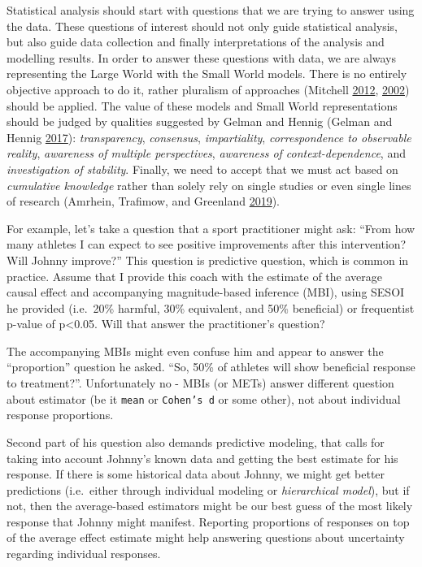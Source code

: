 \documentclass[
]{book}
\begin{document}
Statistical analysis should start with questions that we are trying to answer using the data. These questions of interest should not only guide statistical analysis, but also guide data collection and finally interpretations of the analysis and modelling results. In order to answer these questions with data, we are always representing the Large World with the Small World models. There is no entirely objective approach to do it, rather pluralism of approaches (Mitchell \protect\hyperlink{ref-mitchellUnsimpleTruthsScience2012}{2012}, \protect\hyperlink{ref-mitchellIntegrativePluralism2002}{2002}) should be applied. The value of these models and Small World representations should be judged by qualities suggested by Gelman and Hennig (Gelman and Hennig \protect\hyperlink{ref-gelmanSubjectiveObjectiveStatistics2017}{2017}): \emph{transparency}, \emph{consensus}, \emph{impartiality}, \emph{correspondence to observable reality}, \emph{awareness of multiple perspectives}, \emph{awareness of context-dependence}, and \emph{investigation of stability}. Finally, we need to accept that we must act based on \emph{cumulative knowledge} rather than solely rely on single studies or even single lines of research (Amrhein, Trafimow, and Greenland \protect\hyperlink{ref-amrheinInferentialStatisticsDescriptive2019}{2019}).

For example, let's take a question that a sport practitioner might ask: ``From how many athletes I can expect to see positive improvements after this intervention? Will Johnny improve?'' This question is predictive question, which is common in practice. Assume that I provide this coach with the estimate of the average causal effect and accompanying magnitude-based inference (MBI), using SESOI he provided (i.e.~20\% harmful, 30\% equivalent, and 50\% beneficial) or frequentist p-value of p\textless0.05. Will that answer the practitioner's question?

The accompanying MBIs might even confuse him and appear to answer the ``proportion'' question he asked. ``So, 50\% of athletes will show beneficial response to treatment?''. Unfortunately no - MBIs (or METs) answer different question about estimator (be it \texttt{mean} or \texttt{Cohen’s\ d} or some other), not about individual response proportions.

Second part of his question also demands predictive modeling, that calls for taking into account Johnny's known data and getting the best estimate for his response. If there is some historical data about Johnny, we might get better predictions (i.e.~either through individual modeling or \emph{hierarchical model}), but if not, then the average-based estimators might be our best guess of the most likely response that Johnny might manifest. Reporting proportions of responses on top of the average effect estimate might help answering questions about uncertainty regarding individual responses.
\end{document}
